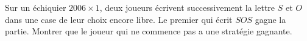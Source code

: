 Sur un échiquier $2006 \times 1$, deux joueurs écrivent successivement la lettre $S$ et $O$ dans une case de leur choix encore libre. Le premier qui écrit $SOS$ gagne la partie. Montrer que le joueur qui ne commence pas a une stratégie gagnante.
